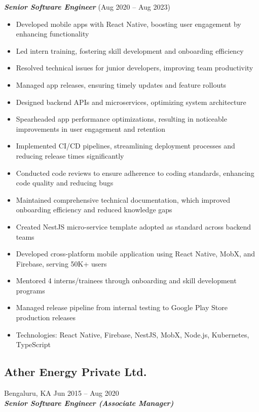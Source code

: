 \documentclass[10pt,a4paper]{article}
\begin{document}
\textbf{\textit{Senior Software Engineer}} (Aug 2020 -- Aug 2023)

\begin{itemize}[leftmargin=*, nosep]
  \item Developed mobile apps with React Native, boosting user engagement by enhancing functionality
  \item Led intern training, fostering skill development and onboarding efficiency
  \item Resolved technical issues for junior developers, improving team productivity
  \item Managed app releases, ensuring timely updates and feature rollouts
  \item Designed backend APIs and microservices, optimizing system architecture
  \item Spearheaded app performance optimizations, resulting in noticeable improvements in user engagement and retention
  \item Implemented CI/CD pipelines, streamlining deployment processes and reducing release times significantly
  \item Conducted code reviews to ensure adherence to coding standards, enhancing code quality and reducing bugs
  \item Maintained comprehensive technical documentation, which improved onboarding efficiency and reduced knowledge gaps
  \item Created NestJS micro-service template adopted as standard across backend teams
  \item Developed cross-platform mobile application using React Native, MobX, and Firebase, serving 50K+ users
  \item Mentored 4 interns/trainees through onboarding and skill development programs
  \item Managed release pipeline from internal testing to Google Play Store production releases
  \item Technologies: React Native, Firebase, NestJS, MobX, Node.js, Kubernetes, TypeScript
\end{itemize}

\subsection*{\large Ather Energy Private Ltd.}
\textcolor{datecolor}{Bengaluru, KA \textbar Jun 2015 -- Aug 2020} \\
\textbf{\textit{Senior Software Engineer (Associate Manager)}}
\end{document}

